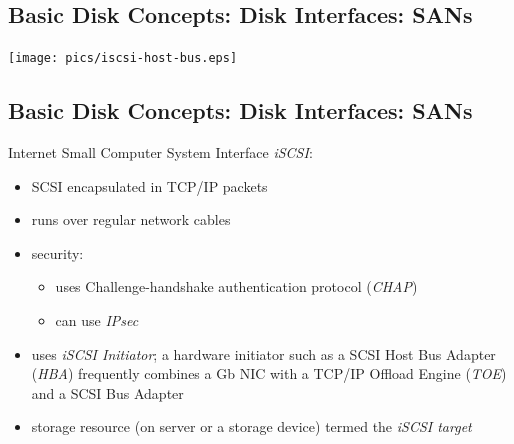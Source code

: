 \documentclass[xga]{xdvislides}
\begin{document}
\subsection{Basic Disk Concepts: Disk Interfaces: SANs}
\vfill
\begin{center}
	\texttt{[image: pics/iscsi-host-bus.eps]} \\
\end{center}
\vfill

\subsection{Basic Disk Concepts: Disk Interfaces: SANs}
Internet Small Computer System Interface {\em iSCSI}:
\begin{itemize}
	\item SCSI encapsulated in TCP/IP packets
	\item runs over regular network cables
	\item security:
		\begin{itemize}
			\item uses Challenge-handshake authentication protocol ({\em CHAP})
			\item can use {\em IPsec}
		\end{itemize}
	\item uses {\em iSCSI Initiator}; a hardware initiator such as a SCSI
		Host Bus Adapter ({\em HBA}) frequently combines a Gb NIC
		with a TCP/IP Offload Engine ({\em TOE}) and a SCSI Bus
		Adapter
	\item storage resource (on server or a storage device) termed the
		{\em iSCSI target}
\end{itemize}

\newpage
\end{document}
